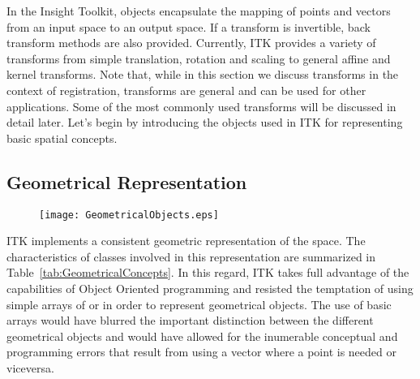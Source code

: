 
\def\tableconfiguration{ | p{3cm} | p{1.8cm} | p{2.5cm} | p{4cm} | }



In the Insight Toolkit,  objects encapsulate the mapping of
points and vectors from an input space to an output space.  If a transform is
invertible, back transform methods are also provided.  Currently, ITK provides
a variety of transforms from simple translation, rotation and scaling to
general affine and kernel transforms.  Note that, while in this section we
discuss transforms in the context of registration, transforms are general and
can be used for other applications. Some of the most commonly used transforms
will be discussed in detail later. Let's begin by introducing the objects used
in ITK for representing basic spatial concepts.


\subsection{Geometrical Representation}
\label{sec:GeometricalObjects}

\begin{figure}
\center
\texttt{[image: GeometricalObjects.eps]}
\label{fig:GeometricalObjects}
\end{figure}
 
ITK implements a consistent geometric representation of the space. The
characteristics of classes involved in this representation are summarized in
Table~\ref{tab:GeometricalConcepts}. In this regard, ITK takes full advantage
of the capabilities of Object Oriented programming and resisted the temptation
of using simple arrays of  or  in order to represent
geometrical objects. The use of basic arrays would have blurred the important
distinction between the different geometrical objects and would have allowed
for the inumerable conceptual and programming errors that result from using a
vector where a point is needed or viceversa.


